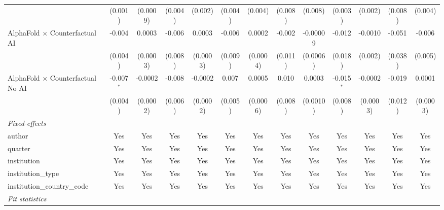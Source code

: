 \begin{tabular}{lcccccccccccc}
                                            & (0.001)       & (0.0009)       & (0.004) & (0.002)       & (0.004) & (0.004)      & (0.008) & (0.008)  & (0.003)       & (0.002)        & (0.008)     & (0.004)\\   
   AlphaFold $\times$ Counterfactual AI     & -0.004        & 0.0003         & -0.006  & 0.0003        & -0.006  & 0.0002       & -0.002  & -0.00009 & -0.012        & -0.0010        & -0.051      & -0.006\\   
                                            & (0.004)       & (0.0003)       & (0.008) & (0.0003)      & (0.009) & (0.0004)     & (0.011) & (0.0006) & (0.018)       & (0.002)        & (0.038)     & (0.005)\\   
   AlphaFold $\times$ Counterfactual No AI  & -0.007$^{*}$  & -0.0002        & -0.008  & -0.0002       & 0.007   & 0.0005       & 0.010   & 0.0003   & -0.015$^{*}$  & -0.0002        & -0.019      & 0.0001\\   
                                            & (0.004)       & (0.0002)       & (0.006) & (0.0002)      & (0.005) & (0.0006)     & (0.008) & (0.0010) & (0.008)       & (0.0003)       & (0.012)     & (0.0003)\\   
   \midrule
   \emph{Fixed-effects}\\
   author                                   & Yes           & Yes            & Yes     & Yes           & Yes     & Yes          & Yes     & Yes      & Yes           & Yes            & Yes         & Yes\\  
   quarter                                  & Yes           & Yes            & Yes     & Yes           & Yes     & Yes          & Yes     & Yes      & Yes           & Yes            & Yes         & Yes\\  
   institution                              & Yes           & Yes            & Yes     & Yes           & Yes     & Yes          & Yes     & Yes      & Yes           & Yes            & Yes         & Yes\\  
   institution\_type                        & Yes           & Yes            & Yes     & Yes           & Yes     & Yes          & Yes     & Yes      & Yes           & Yes            & Yes         & Yes\\  
   institution\_country\_code               & Yes           & Yes            & Yes     & Yes           & Yes     & Yes          & Yes     & Yes      & Yes           & Yes            & Yes         & Yes\\  
   \midrule
   \emph{Fit statistics}\\

\end{tabular}
